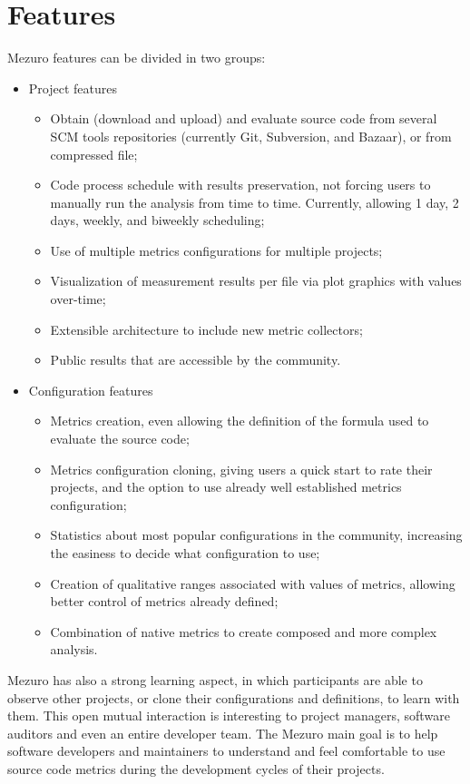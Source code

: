\section{Features}
\label{sec:features}

Mezuro features can be divided in two groups:

\begin{itemize}
    \item Project features
    \begin{itemize}
        \item Obtain (download and upload) and evaluate source code from
            several SCM tools repositories (currently Git, Subversion, and
            Bazaar), or from compressed file;
        \item Code process schedule with results preservation, not forcing
            users to manually run the analysis from time to time. Currently,
            allowing 1 day, 2 days, weekly, and biweekly scheduling;
        \item Use of multiple metrics configurations for multiple projects;
        \item Visualization of measurement results per file via plot graphics
            with values over-time;
        \item Extensible architecture to include new metric collectors;
        \item Public results that are accessible by the community.
    \end{itemize}

    \item Configuration features
    \begin{itemize}
        \item Metrics creation, even allowing the definition of the formula
            used to evaluate the source code;
        \item Metrics configuration cloning, giving users a quick start to rate
            their projects, and the option to use already well established
            metrics configuration;
        \item Statistics about most popular configurations in the community,
            increasing the easiness to decide what configuration to use;
        \item Creation of qualitative ranges associated with values of metrics,
            allowing better control of metrics already defined;
        \item Combination of native metrics to create composed and more complex
            analysis.
    \end{itemize}
\end{itemize}

Mezuro has also a strong learning aspect, in which participants are able to
observe other projects, or clone their configurations and definitions, to learn
with them.  This open mutual interaction is interesting to project managers,
software auditors and even an entire developer team. The Mezuro main goal is to
help software developers and maintainers to understand and feel comfortable to
use source code metrics during the development cycles of their projects.

